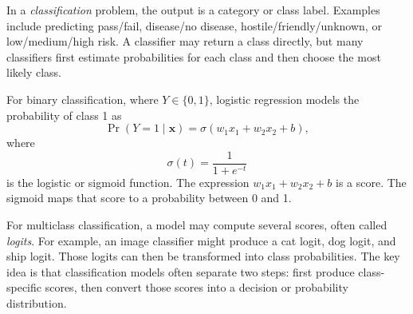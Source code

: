 In a \emph{classification} problem, the output is a category or class label.  Examples include predicting pass/fail, disease/no disease, hostile/friendly/unknown, or low/medium/high risk.  A classifier may return a class directly, but many classifiers first estimate probabilities for each class and then choose the most likely class.

For binary classification, where $Y\in\{0,1\}$, logistic regression models the probability of class 1 as
\begin{equation}
  \Pr(Y=1\mid \mathbf{x}) = \sigma(w_1x_1+w_2x_2+b),
  \label{eq:logistic-first}
\end{equation}
where
\begin{equation}
  \sigma(t) = \frac{1}{1+e^{-t}}
\end{equation}
is the logistic or sigmoid function.  The expression $w_1x_1+w_2x_2+b$ is a score.  The sigmoid maps that score to a probability between 0 and 1.

For multiclass classification, a model may compute several scores, often called \emph{logits}.  For example, an image classifier might produce a cat logit, dog logit, and ship logit.  Those logits can then be transformed into class probabilities.  The key idea is that classification models often separate two steps: first produce class-specific scores, then convert those scores into a decision or probability distribution.

